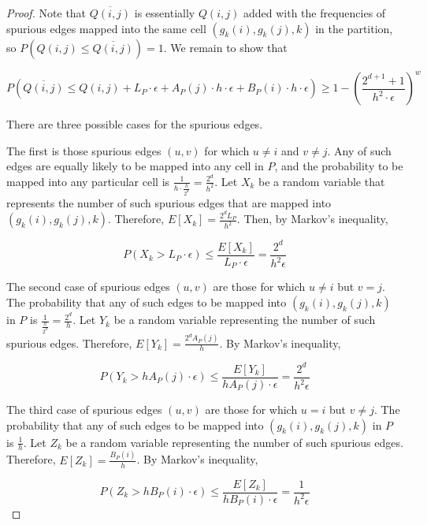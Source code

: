 \begin{proof}
  Note that $\overline{Q(i,j)}$ is essentially $Q(i,j)$ added with the frequencies of spurious edges mapped into the same cell $(g_k(i),g_k(j),k)$ in the partition, so $P(Q(i,j) \leq \overline{Q(i,j)}) = 1$. We remain to show that

\[
P(\overline{Q(i,j)} \leq Q(i,j) + L_P \cdot \epsilon + A_P(j) \cdot h \cdot \epsilon + B_P(i) \cdot h \cdot \epsilon) \geq 1-(\frac{2^{d+1}+1}{h^2\cdot\epsilon})^w
\]

  There are three possible cases for the spurious edges.
  
The first is those spurious edges $(u,v)$ for which $u \neq i$ and $v \neq j$. Any of such edges are equally likely to be mapped into any cell in $P$, and the probability to be mapped into any particular cell is $\frac{1}{h \cdot \frac{h}{2^d}} = \frac{2^d}{h^2}$. Let $X_k$ be a random variable that represents the number of such spurious edges that are mapped into $(g_k(i),g_k(j),k)$. Therefore, $E[X_k] = \frac{2^dL_P}{h^2}$. Then, by Markov's inequality,

\begin{equation} \label{efreq1}
P(X_k > L_P \cdot \epsilon) \leq \frac{E[X_k]}{L_P \cdot \epsilon} = \frac{2^d}{h^2\epsilon}
\end{equation}

The second case of spurious edges $(u,v)$ are those for which $u \neq i$ but $v=j$. The probability that any of such edges to be mapped into $(g_k(i),g_k(j),k)$ in $P$ is $\frac{1}{\frac{h}{2^d}} = \frac{2^d}{h}$. Let $Y_k$ be a random variable representing the number of such spurious edges. Therefore, $E[Y_k] = \frac{2^dA_P(j)}{h}$. By Markov's inequality,

\begin{equation} \label{efreq2}
P(Y_k > h A_P(j) \cdot \epsilon) \leq \frac{E[Y_k]}{h A_P(j) \cdot \epsilon} = \frac{2^d}{h^2\epsilon}
\end{equation}

The third case of spurious edges $(u,v)$ are those for which $u=i$ but $v \neq j$. The probability that any of such edges to be mapped into $(g_k(i),g_k(j),k)$ in $P$ is $\frac{1}{h}$. Let $Z_k$ be a random variable representing the number of such spurious edges. Therefore, $E[Z_k] = \frac{B_P(i)}{h}$. By Markov's inequality,

\begin{equation} \label{efreq3}
P(Z_k > h B_P(i) \cdot \epsilon) \leq \frac{E[Z_k]}{h B_P(i) \cdot \epsilon} = \frac{1}{h^2\epsilon}
\end{equation}


\end{proof}
